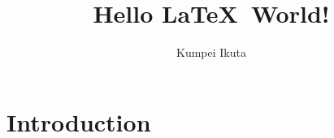 \documentclass[twocolumn]{article}
\title{Hello \LaTeX ~World!}
\date{}
\author{Kumpei Ikuta}
\begin{document}
\maketitle

\begin{abstract}
    
\end{abstract}

\section{Introduction}




\end{document}
